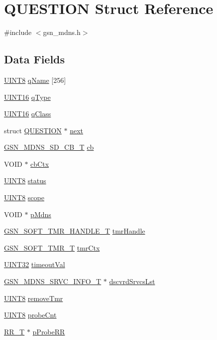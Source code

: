 \hypertarget{a00455}{
\section{QUESTION Struct Reference}
\label{a00455}
}


{\ttfamily \#include $<$gsn\_\-mdns.h$>$}

\subsection*{Data Fields}
\begin{DoxyCompactItemize}
\item 
\hyperlink{a00660_gab27e9918b538ce9d8ca692479b375b6a}{UINT8} \hyperlink{a00455_aa27c08470cf3f9fcc816576da0f6e5f8}{qName} \mbox{[}256\mbox{]}
\item 
\hyperlink{a00660_ga09f1a1fb2293e33483cc8d44aefb1eb1}{UINT16} \hyperlink{a00455_af988990cedc3c53e6fb79dec44129dd9}{qType}
\item 
\hyperlink{a00660_ga09f1a1fb2293e33483cc8d44aefb1eb1}{UINT16} \hyperlink{a00455_afa93f8c57cd3599611c2bdd66fe4433b}{qClass}
\item 
struct \hyperlink{a00455}{QUESTION} $\ast$ \hyperlink{a00455_a383361ee362e14b42439287b8c777e91}{next}
\item 
\hyperlink{a00668_gaef8391be45a1399b7895289b3b56d632}{GSN\_\-MDNS\_\-SD\_\-CB\_\-T} \hyperlink{a00455_a01d247a395cb705f6e9037d660aaa566}{cb}
\item 
VOID $\ast$ \hyperlink{a00455_abc1717c5357c7dda5c2abef096a06f1f}{cbCtx}
\item 
\hyperlink{a00660_gab27e9918b538ce9d8ca692479b375b6a}{UINT8} \hyperlink{a00455_ac4f6d5d1544a8d2c1309479ffe1b61ab}{status}
\item 
\hyperlink{a00660_gab27e9918b538ce9d8ca692479b375b6a}{UINT8} \hyperlink{a00455_aa73cc4a6cdd8178cc27ecbdd515c750c}{scope}
\item 
VOID $\ast$ \hyperlink{a00455_a78ed200b6ab62a58bf95dbdcaad70ad9}{pMdns}
\item 
\hyperlink{a00229}{GSN\_\-SOFT\_\-TMR\_\-HANDLE\_\-T} \hyperlink{a00455_a0097381a660d9af2442a1b78638239e1}{tmrHandle}
\item 
\hyperlink{a00229}{GSN\_\-SOFT\_\-TMR\_\-T} \hyperlink{a00455_a963f9a3df571404f182b389d679ad283}{tmrCtx}
\item 
\hyperlink{a00660_gae1e6edbbc26d6fbc71a90190d0266018}{UINT32} \hyperlink{a00455_a3ff270d1f825f964298205e740de4e1e}{timeoutVal}
\item 
\hyperlink{a00146}{GSN\_\-MDNS\_\-SRVC\_\-INFO\_\-T} $\ast$ \hyperlink{a00455_ae26a846dd02159dab9bb42ccc2532439}{dscvrdSrvcsLst}
\item 
\hyperlink{a00660_gab27e9918b538ce9d8ca692479b375b6a}{UINT8} \hyperlink{a00455_ac5a72f209d95561607f46af972b8f8e2}{removeTmr}
\item 
\hyperlink{a00660_gab27e9918b538ce9d8ca692479b375b6a}{UINT8} \hyperlink{a00455_a166af3a50a8a06204bd41361f3b54dcc}{probeCnt}
\item 
\hyperlink{a00457}{RR\_\-T} $\ast$ \hyperlink{a00455_a3607aae80ea78e020d44ffb6610db690}{pProbeRR}
\end{DoxyCompactItemize}


